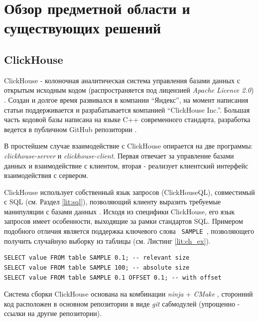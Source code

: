 \section{Обзор предметной области и существующих решений}
\subsection{ClickHouse} \label{lit:ch}
ClickHouse - колоночная аналитическая система управления базами данных с открытым исходным кодом (распространяется под лицензией \textit{Apache Licence 2.0}) \cite{ch_doc}. Создан и долгое время развивался в компании \enquote{Яндекс}, на момент написания статьи поддерживается и разрабатывается компанией \enquote{ClickHouse Inc.}. Большая часть кодовой базы написана на языке C++ современного стандарта, разработка ведется в публичном GitHub репозитории \cite{ch_repo}. 

В простейшем случае взаимодействие с ClickHouse опирается на две программы: \textit{clickhouse-server} и \textit{clickhouse-client}. Первая отвечает за управление базами данных и взаимодействие с клиентом, вторая - реализует клиентский интерфейс взаимодействия с сервером.

ClickHouse использует собственный язык запросов (ClickHouseQL), совместимый с SQL (см. Раздел \ref{lit:sql}), позволяющий клиенту выразить требуемые манипуляции с базами данных \cite{ch_sql_ref}. Исходя из специфики ClickHouse, его язык запросов имеет особенности, выходящие за рамки стандартов SQL. Примером подобного отличия является поддержка ключевого слова \texttt{ SAMPLE }, позволяющего получить случайную выборку из таблицы (см. Листинг \ref{lit:ch_ex}).

\begin{code}
    \label{lit:ch_ex}
    \begin{verbatim}
SELECT value FROM table SAMPLE 0.1; -- relevant size
SELECT value FROM table SAMPLE 100; -- absolute size
SELECT value FROM table SAMPLE 0.1 OFFSET 0.1; -- with offset
    \end{verbatim}
\end{code}

Система сборки ClickHouse основана на комбинации \textit{ninja} + \textit{CMake} \cite{ninja}\cite{cmake}, сторонний код расположен в основном репозитории в виде \textit{git} сабмодулей (упрощенно - ссылки на другие репозитории). 

